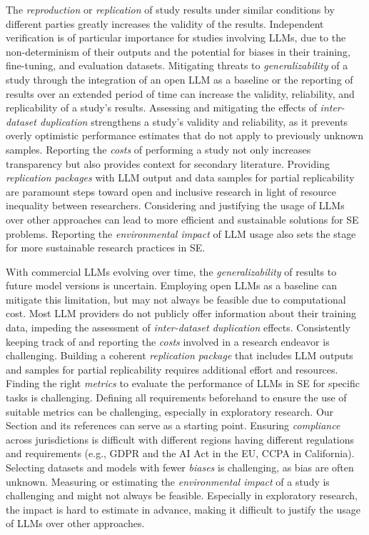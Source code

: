 
The \emph{reproduction} or \emph{replication} of study results under similar conditions by different parties greatly increases the validity of the results. %
Independent verification is of particular importance for studies involving LLMs, due to the non-determinism of their outputs and the potential for biases in their training, fine-tuning, and evaluation datasets.
Mitigating threats to \emph{generalizability} of a study through the integration of an open LLM as a baseline or the reporting of results over an extended period of time can increase the validity, reliability, and replicability of a study's results.
Assessing and mitigating the effects of \emph{inter-dataset duplication} strengthens a study's validity and reliability, as it prevents overly optimistic performance estimates that do not apply to previously unknown samples.
Reporting the \emph{costs} of performing a study not only increases transparency but also provides context for secondary literature. %
Providing \emph{replication packages} with LLM output and data samples for partial replicability are paramount steps toward open and inclusive research in light of resource inequality between researchers.
Considering and justifying the usage of LLMs over other approaches can lead to more efficient and sustainable solutions for SE problems. 
Reporting the \emph{environmental impact} of LLM usage also sets the stage for more sustainable research practices in SE.


With commercial LLMs evolving over time, the \emph{generalizability} of results to future model versions is uncertain.
Employing open LLMs as a baseline can mitigate this limitation, but may not always be feasible due to computational cost.
Most LLM providers do not publicly offer information about their training data, impeding the assessment of \emph{inter-dataset duplication} effects.
Consistently keeping track of and reporting the \emph{costs} involved in a research endeavor is challenging.
Building a coherent \emph{replication package} that includes LLM outputs and samples for partial replicability requires additional effort and resources.
Finding the right \emph{metrics} to evaluate the performance of LLMs in SE for specific tasks is challenging.
Defining all requirements beforehand to ensure the use of suitable metrics can be challenging, especially in exploratory research.
Our Section \benchmarksmetrics and its references can serve as a starting point.
Ensuring \emph{compliance} across jurisdictions is difficult with different regions having different regulations and requirements (e.g., GDPR and the AI Act in the EU, CCPA in California).
Selecting datasets and models with fewer \emph{biases} is challenging, as bias are often unknown.
Measuring or estimating the \emph{environmental impact} of a study is challenging and might not always be feasible.
Especially in exploratory research, the impact is hard to estimate in advance, making it difficult to justify the usage of LLMs over other approaches.

